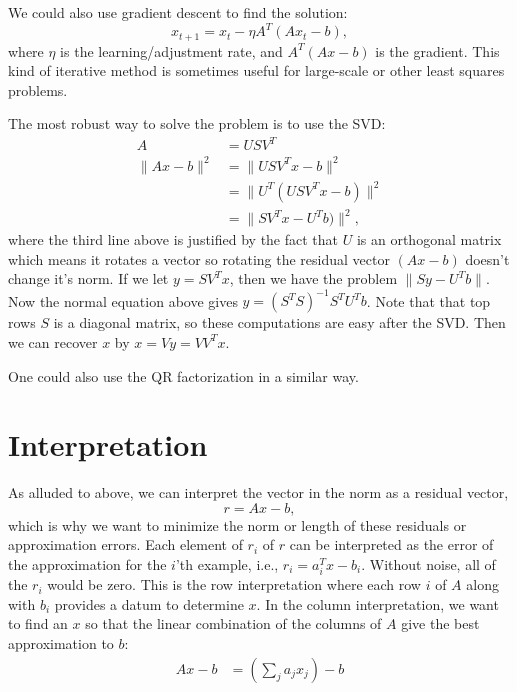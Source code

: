 \documentclass{article}
\begin{document}
We could also use gradient descent to find the solution:
\begin{equation}
x_{t+1} = x_t - \eta A^T(Ax_t - b),
\end{equation}
where $\eta$ is the learning/adjustment rate, and $A^T (Ax - b)$ is the gradient.  This kind of iterative method is sometimes useful for large-scale or other least squares problems.

The most robust way to solve the problem is to use the SVD:
\begin{align}
A & = USV^T \\
\lVert{Ax - b}\rVert^2 &= \lVert{USV^Tx - b}\rVert^2 \\
&= \lVert{U^T(USV^Tx - b)}\rVert^2 \\
&= \lVert{SV^Tx - U^Tb)}\rVert^2,
\end{align}
where the third line above is justified by the fact that $U$ is an orthogonal matrix which means it rotates a vector so rotating the residual vector $(Ax - b)$ doesn't change it's norm.
If we let $y = SV^Tx$, then we have the problem $\lVert{Sy - U^T b}\rVert$.  Now the normal equation above gives $y = (S^T S)^{-1} S^T U^T b$.  Note that that top rows $S$ is a diagonal matrix, so these computations are easy after the SVD.  Then we can recover $x$ by $x = Vy = VV^Tx$.

One could also use the QR factorization in a similar way.

\section{Interpretation}

As alluded to above, we can interpret the vector in the norm as a residual vector,
\begin{equation}
r =  Ax - b,
\end{equation}
which is why we want to minimize the norm or length of these residuals or approximation errors.  Each element of $r_i$ of $r$ can be interpreted as the error of the approximation for the $i$'th example, i.e., $r_i = a_i^T x - b_i$.  Without noise, all of the $r_i$ would be zero.  This is the row interpretation where each row $i$ of $A$ along with $b_i$ provides a datum to determine $x$.  In the column interpretation, we want to find an $x$ so that the linear combination of the columns of $A$ give the best approximation to $b$:
\begin{align}
Ax - b &= \left(\sum_j a_j x_j\right) - b
\end{align}
\end{document}
